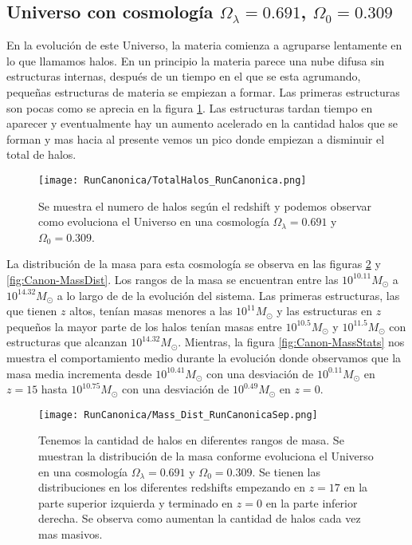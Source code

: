 \subsection{Universo con cosmología  \texorpdfstring{$\Omega_\lambda = 0.691$, $\Omega_0 = 0.309$ }{Omega lambda = 0.691, Omega 0 = 0.309}  }

 En la evolución de este Universo, la materia comienza a agruparse lentamente en lo que llamamos halos. En un principio la materia parece una nube difusa sin estructuras internas, después de un tiempo en el que se esta agrumando, pequeñas estructuras de materia se empiezan a formar. Las primeras estructuras son pocas como se aprecia en la figura \ref{fig:Canon_TotalHalos}. Las estructuras tardan tiempo en aparecer y eventualmente hay un aumento acelerado en la cantidad halos que se forman y mas hacia al presente vemos un pico donde empiezan a disminuir el total de halos.

\begin{figure}[H]
    \centering
    \texttt{[image: RunCanonica/TotalHalos\_RunCanonica.png]}
    \caption[Evolución del número de halos en un Universo $\Omega_\lambda = 0.691 $, $\Omega_0 = 0.309$]{\footnotesize Se muestra el numero de halos según el redshift y podemos observar como evoluciona el Universo en una cosmología $\Omega_\lambda = 0.691 $ y $\Omega_0 = 0.309$.}
    \label{fig:Canon_TotalHalos}
\end{figure}

La distribución de la masa para esta cosmología se observa en las figuras \ref{fig:Canon-MassDistSep} y \ref{fig:Canon-MassDist}. Los rangos de la masa se encuentran entre las $10^{10.11}M_\odot$ a $10^{14.32}M_\odot$ a lo largo de de la evolución del sistema. Las primeras estructuras, las que tienen $z$ altos, tenían masas menores a las $10^{11}M_\odot$ y las estructuras en $z$ pequeños la mayor parte de los halos tenían masas entre $10^{10.5}M_\odot$ y $10^{11.5}M_\odot$ con estructuras que alcanzan $10^{14.32}M_\odot$. Mientras, la figura \ref{fig:Canon-MassStats} nos muestra el comportamiento medio durante la evolución donde observamos que la masa media incrementa desde $10^{10.41}M_\odot$ con una desviación de $10^{0.11}M_\odot$ en $z=15$ hasta $10^{10.75}M_\odot$ con una desviación de $10^{0.49}M_\odot$ en $z=0$.

\begin{figure}[H]
    \centering
    \texttt{[image: RunCanonica/Mass\_Dist\_RunCanonicaSep.png]}
    \caption[Distribución de masa en la evolución de un Universo $\Omega_\lambda = 0.691 $, $\Omega_0 = 0.309$]{\footnotesize Tenemos la cantidad de halos en diferentes rangos de masa. Se muestran la distribución de la masa conforme evoluciona el Universo en una cosmología $\Omega_\lambda = 0.691 $ y $\Omega_0 = 0.309$. Se tienen las distribuciones en los diferentes redshifts empezando en $z=17$ en la parte superior izquierda y terminado en $z=0$ en la parte inferior derecha. Se observa como aumentan la cantidad de halos cada vez mas masivos.}
    \label{fig:Canon-MassDistSep}
\end{figure}

